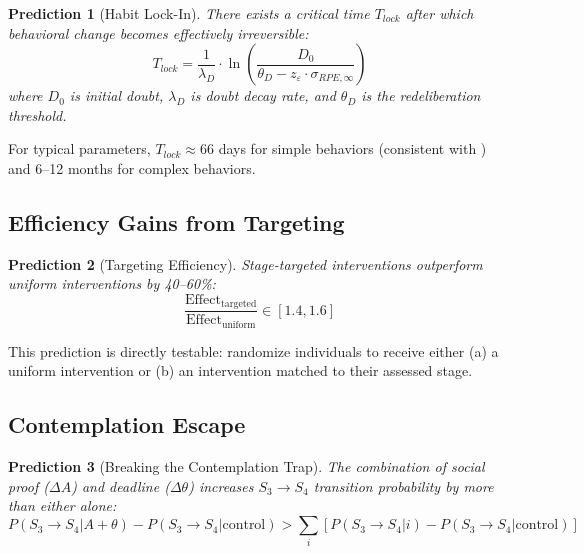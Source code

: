 \documentclass[12pt]{article}
\newtheorem{prediction}{Prediction}
\begin{document}
\begin{prediction}[Habit Lock-In]
There exists a critical time $T_{lock}$ after which behavioral change becomes effectively irreversible:
\begin{equation}
T_{lock} = \frac{1}{\lambda_D} \cdot \ln\left(\frac{D_0}{\theta_D - z_\varepsilon \cdot \sigma_{RPE,\infty}}\right)
\end{equation}
where $D_0$ is initial doubt, $\lambda_D$ is doubt decay rate, and $\theta_D$ is the redeliberation threshold.
\end{prediction}

For typical parameters, $T_{lock} \approx 66$ days for simple behaviors (consistent with \citealt{lally2010habits}) and 6--12 months for complex behaviors.

\subsection{Efficiency Gains from Targeting}

\begin{prediction}[Targeting Efficiency]
Stage-targeted interventions outperform uniform interventions by 40--60\%:
\begin{equation}
\frac{\text{Effect}_{\text{targeted}}}{\text{Effect}_{\text{uniform}}} \in [1.4, 1.6]
\end{equation}
\end{prediction}

This prediction is directly testable: randomize individuals to receive either (a) a uniform intervention or (b) an intervention matched to their assessed stage.

\subsection{Contemplation Escape}

\begin{prediction}[Breaking the Contemplation Trap]
The combination of social proof ($\Delta A$) and deadline ($\Delta \theta$) increases $S_3 \to S_4$ transition probability by more than either alone:
\begin{equation}
P(S_3 \to S_4 | A + \theta) - P(S_3 \to S_4 | \text{control}) > \sum_i \left[P(S_3 \to S_4 | i) - P(S_3 \to S_4 | \text{control})\right]
\end{equation}
\end{prediction}


\end{document}
